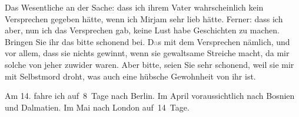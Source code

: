 \pstart
           Das Wesentliche an der Sache: dass ich ihrem Vater wahrscheinlich kein Versprechen gegeben hätte, wenn
               ich Mirjam sehr lieb hätte. Ferner: dass ich
               aber, nun ich das Versprechen gab, keine Lust habe Geschichten zu machen. Bringen Sie
               ihr das bitte schonend bei. D\textcolor{gray}{a}s mit dem Versprechen nämlich, und
               vor allem, dass sie nichts gewinnt, wenn sie gewaltsame Streiche macht, da mir solche
               von jeher zuwider waren. Aber bitte, seien Sie sehr schonend, weil sie mir mit
               Selbstmord droht, was auch eine hübsche Gewohnheit von ihr ist.\pend
           
\pstart
           Am 14. fahre ich auf 8 Tage nach Berlin. Im April voraussichtlich
               nach Bosnien und Dalmatien. Im Mai nach London auf 14 Tage.\pend
           
